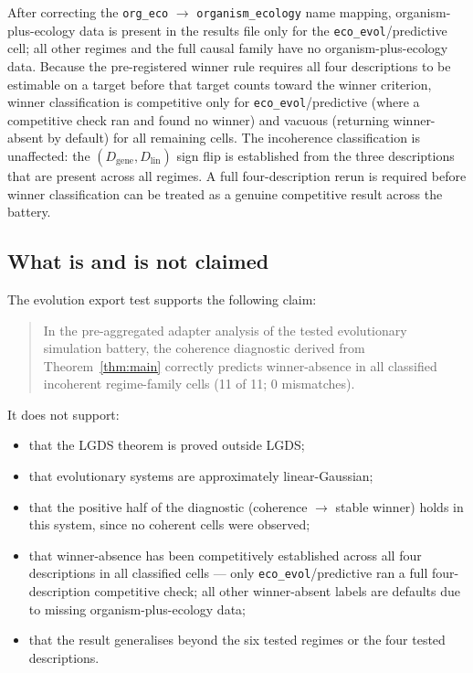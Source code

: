 \documentclass[11pt]{article}
\begin{document}
After correcting the \texttt{org\_eco} $\to$ \texttt{organism\_ecology}
name mapping, organism-plus-ecology data is present in the results file
only for the \texttt{eco\_evol}/predictive cell; all other regimes and the
full causal family have no organism-plus-ecology data.
Because the pre-registered winner rule requires all four descriptions to
be estimable on a target before that target counts toward the winner
criterion, winner classification is competitive only for
\texttt{eco\_evol}/predictive (where a competitive check ran and found no
winner) and vacuous (returning winner-absent by default) for all remaining
cells.
The incoherence classification is unaffected: the
$(D_\mathrm{gene}, D_\mathrm{lin})$ sign flip is established from the
three descriptions that are present across all regimes.
A full four-description rerun is required before winner classification
can be treated as a genuine competitive result across the battery.

\subsection{What is and is not claimed}

The evolution export test supports the following claim:

\begin{quote}
In the pre-aggregated adapter analysis of the tested evolutionary simulation
battery, the coherence diagnostic derived from Theorem~\ref{thm:main}
correctly predicts winner-absence in all classified incoherent
regime-family cells (11 of 11; 0 mismatches).
\end{quote}

It does not support:
\begin{itemize}
    \item that the LGDS theorem is proved outside LGDS;
    \item that evolutionary systems are approximately linear-Gaussian;
    \item that the positive half of the diagnostic (coherence $\to$ stable
          winner) holds in this system, since no coherent cells were observed;
    \item that winner-absence has been competitively established across all
          four descriptions in all classified cells — only
          \texttt{eco\_evol}/predictive ran a full four-description
          competitive check; all other winner-absent labels are defaults
          due to missing organism-plus-ecology data;
    \item that the result generalises beyond the six tested regimes or the
          four tested descriptions.
\end{itemize}
\end{document}
